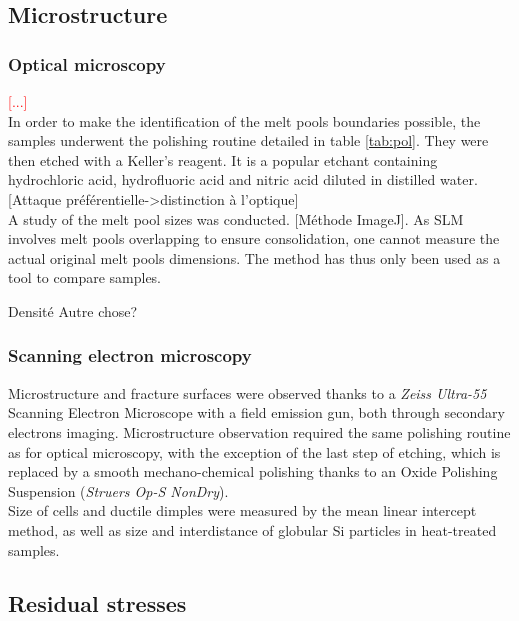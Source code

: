 \subsection{Microstructure}

\subsubsection{Optical microscopy}
\label{MMOM}

\textcolor{red}{[...]}\\

In order to make the identification of the melt pools boundaries possible, the samples underwent the polishing routine detailed in table \ref{tab:pol}. They were then etched with	a Keller's reagent. It is a popular etchant containing hydrochloric acid, hydrofluoric acid and nitric acid diluted in distilled water. [Attaque préférentielle->distinction à l'optique] \\

A study of the melt pool sizes was conducted. [Méthode ImageJ]. As SLM involves melt pools overlapping to ensure consolidation, one cannot measure the actual original melt pools dimensions. The method has thus only been used as a tool to compare samples.

Densité
Autre chose?

\subsubsection{Scanning electron microscopy}

Microstructure and fracture surfaces were observed thanks to a \textit{Zeiss Ultra-55} Scanning Electron Microscope with a field emission gun, both through secondary electrons imaging. Microstructure observation required the same polishing routine as for optical microscopy, with the exception of the last step of etching, which is replaced by a smooth mechano-chemical polishing thanks to an Oxide Polishing Suspension (\textit{Struers Op-S NonDry}).\\

Size of cells and ductile dimples were measured by the mean linear intercept method, as well as size and interdistance of globular Si particles in heat-treated samples.

\subsection{Residual stresses}

